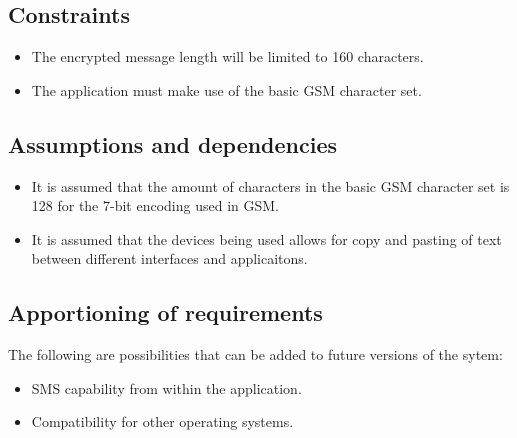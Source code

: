 \subsection{Constraints}
\begin{itemize}
\item The encrypted message length will be limited to 160 characters.
\item The application must make use of the basic GSM character set.
\end{itemize}



\subsection{Assumptions and dependencies}

\begin{itemize}
\item It is assumed that the amount of characters in the basic GSM character set is 128 for the 7-bit encoding used in GSM.
\item It is assumed that the devices being used allows for copy and pasting of text between different interfaces and applicaitons.
\end{itemize}


\subsection{Apportioning of requirements}
The following are possibilities that can be added to future versions of the sytem:
\begin{itemize}
\item SMS capability from within the application.
\item Compatibility for other operating systems.
\end{itemize}